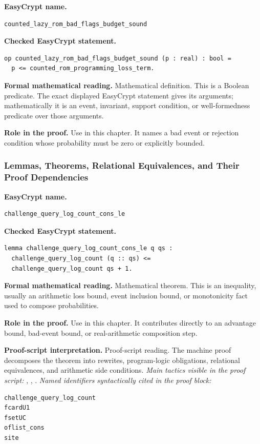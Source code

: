 \begin{formaldefinition}
\noindent\textbf{EasyCrypt name.}
\begin{lstlisting}[language=EasyCrypt,basicstyle=\ttfamily\scriptsize]
counted_lazy_rom_bad_flags_budget_sound
\end{lstlisting}
\noindent\textbf{Checked EasyCrypt statement.}
\begin{lstlisting}[language=EasyCrypt,basicstyle=\ttfamily\scriptsize]
op counted_lazy_rom_bad_flags_budget_sound (p : real) : bool =
  p <= counted_rom_programming_loss_term.
\end{lstlisting}
\noindent\textbf{Formal mathematical reading.}
Mathematical definition. This is a Boolean predicate.  The exact displayed EasyCrypt statement gives its arguments; mathematically it is an event, invariant, support condition, or well-formedness predicate over those arguments.

\noindent\textbf{Role in the proof.}
Use in this chapter. It names a bad event or rejection condition whose probability must be zero or explicitly bounded.

\end{formaldefinition}

\subsubsection*{Lemmas, Theorems, Relational Equivalences, and Their Proof Dependencies}
\begin{formaltheorem}
\noindent\textbf{EasyCrypt name.}
\begin{lstlisting}[language=EasyCrypt,basicstyle=\ttfamily\scriptsize]
challenge_query_log_count_cons_le
\end{lstlisting}
\noindent\textbf{Checked EasyCrypt statement.}
\begin{lstlisting}[language=EasyCrypt,basicstyle=\ttfamily\scriptsize]
lemma challenge_query_log_count_cons_le q qs :
  challenge_query_log_count (q :: qs) <=
  challenge_query_log_count qs + 1.
\end{lstlisting}
\noindent\textbf{Formal mathematical reading.}
Mathematical theorem. This is an inequality, usually an arithmetic loss bound, event inclusion bound, or monotonicity fact used to compose probabilities.

\noindent\textbf{Role in the proof.}
Use in this chapter. It contributes directly to an advantage bound, bad-event bound, or real-arithmetic composition step.

\noindent\textbf{Proof-script interpretation.}
Proof-script reading. The machine proof decomposes the theorem into rewrites, program-logic obligations, relational equivalences, and arithmetic side conditions.
\emph{Main tactics visible in the proof script:} , , .
\emph{Named identifiers syntactically cited in the proof block:}
\begin{lstlisting}[language=EasyCrypt,basicstyle=\ttfamily\scriptsize]
challenge_query_log_count
fcardU1
fsetUC
oflist_cons
site
\end{lstlisting}

\end{formaltheorem}

